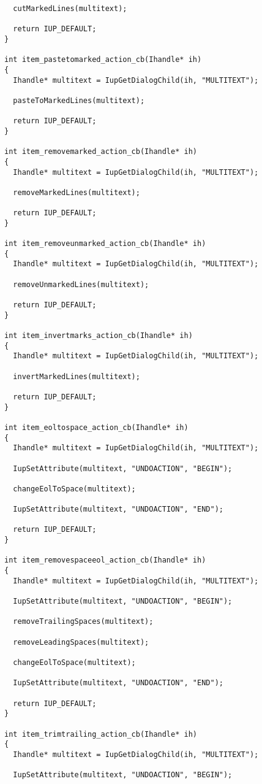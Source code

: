 \documentclass{ctexart}
\begin{document}
\begin{lstlisting}
  cutMarkedLines(multitext);

  return IUP_DEFAULT;
}

int item_pastetomarked_action_cb(Ihandle* ih)
{
  Ihandle* multitext = IupGetDialogChild(ih, "MULTITEXT");

  pasteToMarkedLines(multitext);

  return IUP_DEFAULT;
}

int item_removemarked_action_cb(Ihandle* ih)
{
  Ihandle* multitext = IupGetDialogChild(ih, "MULTITEXT");

  removeMarkedLines(multitext);

  return IUP_DEFAULT;
}

int item_removeunmarked_action_cb(Ihandle* ih)
{
  Ihandle* multitext = IupGetDialogChild(ih, "MULTITEXT");

  removeUnmarkedLines(multitext);

  return IUP_DEFAULT;
}

int item_invertmarks_action_cb(Ihandle* ih)
{
  Ihandle* multitext = IupGetDialogChild(ih, "MULTITEXT");

  invertMarkedLines(multitext);

  return IUP_DEFAULT;
}

int item_eoltospace_action_cb(Ihandle* ih)
{
  Ihandle* multitext = IupGetDialogChild(ih, "MULTITEXT");

  IupSetAttribute(multitext, "UNDOACTION", "BEGIN");

  changeEolToSpace(multitext);

  IupSetAttribute(multitext, "UNDOACTION", "END");

  return IUP_DEFAULT;
}

int item_removespaceeol_action_cb(Ihandle* ih)
{
  Ihandle* multitext = IupGetDialogChild(ih, "MULTITEXT");

  IupSetAttribute(multitext, "UNDOACTION", "BEGIN");

  removeTrailingSpaces(multitext);

  removeLeadingSpaces(multitext);

  changeEolToSpace(multitext);

  IupSetAttribute(multitext, "UNDOACTION", "END");

  return IUP_DEFAULT;
}

int item_trimtrailing_action_cb(Ihandle* ih)
{
  Ihandle* multitext = IupGetDialogChild(ih, "MULTITEXT");

  IupSetAttribute(multitext, "UNDOACTION", "BEGIN");


\end{lstlisting}
\end{document}
